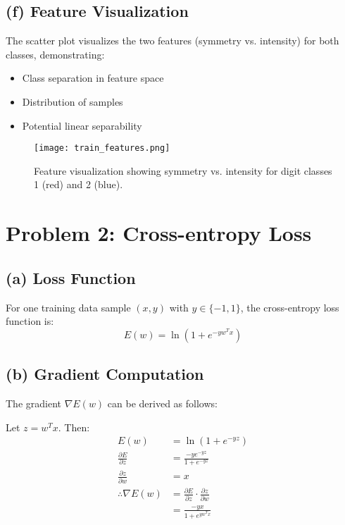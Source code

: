 \documentclass{article}
\begin{document}
\subsection*{(f) Feature Visualization}
The scatter plot visualizes the two features (symmetry vs. intensity) for both classes, demonstrating:
\begin{itemize}
    \item Class separation in feature space
    \item Distribution of samples
    \item Potential linear separability
\end{itemize}

\begin{figure}[H]  %
    \centering
    \texttt{[image: train\_features.png]}
    \caption{Feature visualization showing symmetry vs. intensity for digit classes 1 (red) and 2 (blue).}
    \label{fig:features}
\end{figure}

\maketitle
\section*{Problem 2: Cross-entropy Loss}

\subsection*{(a) Loss Function}
For one training data sample $(x, y)$ with $y \in \{-1,1\}$, the cross-entropy loss function is:
\[
E(w) = \ln(1 + e^{-y w^T x})
\]

\subsection*{(b) Gradient Computation}
The gradient $\nabla E(w)$ can be derived as follows:

Let $z = w^T x$. Then:
\begin{align*}
E(w) &= \ln(1 + e^{-yz}) \\
\frac{\partial E}{\partial z} &= \frac{-y e^{-yz}}{1 + e^{-yz}} \\
\frac{\partial z}{\partial w} &= x \\
\therefore \nabla E(w) &= \frac{\partial E}{\partial z} \cdot \frac{\partial z}{\partial w} \\
&= \frac{-y x}{1 + e^{yw^T x}}
\end{align*}
\end{document}
